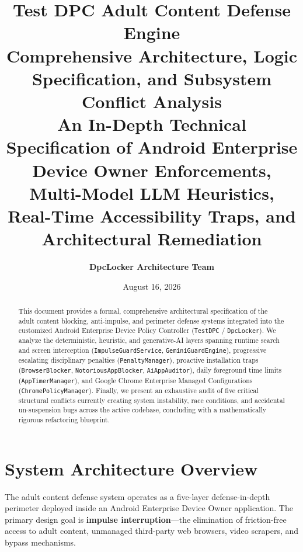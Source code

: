 \documentclass[11pt,a4paper]{article}
\title{
    \vspace{-1.5cm}
    \Huge\textbf{\color{primaryblue}Test DPC Adult Content Defense Engine}\\[0.4cm]
    \Large\textbf{Comprehensive Architecture, Logic Specification, and Subsystem Conflict Analysis}\\[0.2cm]
    \normalsize An In-Depth Technical Specification of Android Enterprise Device Owner Enforcements, Multi-Model LLM Heuristics, Real-Time Accessibility Traps, and Architectural Remediation
}
\author{\textbf{DpcLocker Architecture Team}}
\date{August 16, 2026}
\begin{document}
\maketitle

\begin{abstract}
This document provides a formal, comprehensive architectural specification of the adult content blocking, anti-impulse, and perimeter defense systems integrated into the customized Android Enterprise Device Policy Controller (\texttt{TestDPC} / \texttt{DpcLocker}). We analyze the deterministic, heuristic, and generative-AI layers spanning runtime search and screen interception (\texttt{ImpulseGuardService}, \texttt{GeminiGuardEngine}), progressive escalating disciplinary penalties (\texttt{PenaltyManager}), proactive installation traps (\texttt{BrowserBlocker}, \texttt{NotoriousAppBlocker}, \texttt{AiAppAuditor}), daily foreground time limits (\texttt{AppTimerManager}), and Google Chrome Enterprise Managed Configurations (\texttt{ChromePolicyManager}). Finally, we present an exhaustive audit of five critical structural conflicts currently creating system instability, race conditions, and accidental un-suspension bugs across the active codebase, concluding with a mathematically rigorous refactoring blueprint.
\end{abstract}

\tableofcontents
\newpage

\section{System Architecture Overview}

The adult content defense system operates as a five-layer defense-in-depth perimeter deployed inside an Android Enterprise Device Owner application. The primary design goal is \textbf{impulse interruption}---the elimination of friction-free access to adult content, unmanaged third-party web browsers, video scrapers, and bypass mechanisms.
\end{document}
